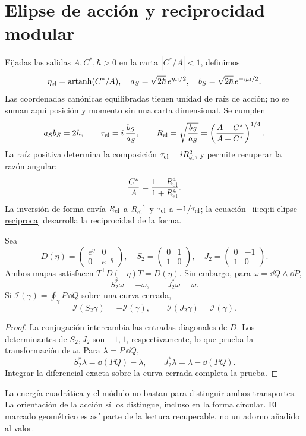 \section{Elipse de acción y reciprocidad modular}
\label{ii:sec:ellipse}
Fijadas las salidas $A,C^*,\hbar>0$ en la carta
$|C^*/A|<1$, definimos
\[
\eta_{\rm el}=\operatorname{artanh}(C^*/A),\quad
a_S=\sqrt{2\hbar}\,e^{\eta_{\rm el}/2},\quad
b_S=\sqrt{2\hbar}\,e^{-\eta_{\rm el}/2}.
\]
Las coordenadas canónicas equilibradas tienen unidad de raíz de acción;
no se suman aquí posición y momento sin una carta dimensional.
Se cumplen
\[
a_Sb_S=2\hbar,\qquad
\tau_{\rm el}=i\,\frac{b_S}{a_S},\qquad
R_{\rm el}=\sqrt{\frac{b_S}{a_S}}
=\left(\frac{A-C^*}{A+C^*}\right)^{1/4}.
\]
La raíz positiva determina la composición $\tau_{\rm el}=iR_{\rm el}^2$,
y permite recuperar la razón angular:
\[
\frac{C^*}{A}=\frac{1-R_{\rm el}^4}{1+R_{\rm el}^4}.
\]
La inversión de forma envía $R_{\rm el}$ a $R_{\rm el}^{-1}$ y
$\tau_{\rm el}$ a $-1/\tau_{\rm el}$; la ecuación~\eqref{ii:eq:ii-elipse-reciproca} desarrolla la reciprocidad de la forma.

\begin{proposition}
Sea
\[
D(\eta)=\begin{pmatrix}e^\eta&0\\0&e^{-\eta}\end{pmatrix},
\quad
S_2=\begin{pmatrix}0&1\\1&0\end{pmatrix},
\quad
J_2=\begin{pmatrix}0&-1\\1&0\end{pmatrix}.
\]
Ambos mapas satisfacen $T^{\mathsf T}D(-\eta)T=D(\eta)$.
Sin embargo, para $\omega=\dd Q\wedge\dd P$,
\[
S_2^*\omega=-\omega,\qquad J_2^*\omega=\omega.
\]
Si $\mathcal I(\gamma)=\oint_\gamma P\,\dd Q$ sobre una curva cerrada,
\[
\mathcal I(S_2\gamma)=-\mathcal I(\gamma),\qquad
\mathcal I(J_2\gamma)=\mathcal I(\gamma).
\]
\end{proposition}
\begin{proof}
La conjugación intercambia las entradas diagonales de $D$.
Los determinantes de $S_2,J_2$ son $-1,1$, respectivamente, lo que
prueba la transformación de $\omega$. Para $\lambda=P\,\dd Q$,
\[
S_2^*\lambda=\dd(PQ)-\lambda,\qquad
J_2^*\lambda=\lambda-\dd(PQ).
\]
Integrar la diferencial exacta sobre la curva cerrada completa la prueba.
\end{proof}

La energía cuadrática y el módulo no bastan para distinguir ambos
transportes. La orientación de la acción sí los distingue, incluso
en la forma circular. El marcado geométrico es así parte de la lectura
recuperable, no un adorno añadido al valor.

